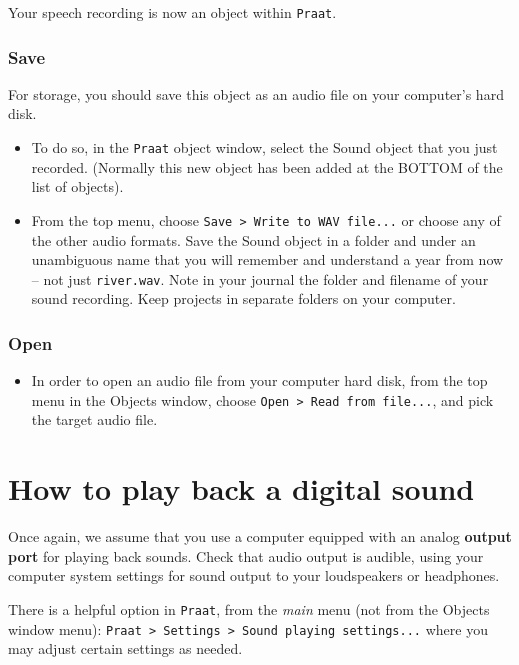 \documentclass[
]{book}
\providecommand{\tightlist}{%
  \setlength{\itemsep}{0pt}\setlength{\parskip}{0pt}}
\begin{document}
Your speech recording is now an object within \texttt{Praat}.

\subsubsection{Save}\label{sec:praatsave}

For storage, you should save this object as an audio file on your computer's hard disk.

\begin{itemize}
\item
  To do so, in the \texttt{Praat} object window, select the Sound object that you just recorded. (Normally this new object has been added at the BOTTOM of the list of objects).
\item
  From the top menu, choose \texttt{Save\ \textgreater{}\ Write\ to\ WAV\ file...} or choose any of the other audio formats. Save the Sound object in a folder and under an unambiguous name that you will remember and understand a year from now -- not just \texttt{river.wav}. Note in your journal the folder and filename of your sound recording. Keep projects in separate folders on your computer.
\end{itemize}

\subsubsection{Open}\label{sec:praatopen}

\begin{itemize}
\tightlist
\item
  In order to open an audio file from your computer hard disk, from the top menu in the Objects window, choose \texttt{Open\ \textgreater{}\ Read\ from\ file...}, and pick the target audio file.
\end{itemize}

\section{How to play back a digital sound}\label{how-to-play-back-a-digital-sound}

Once again, we assume that you use a computer equipped with an analog \textbf{output port} for playing back sounds. Check that audio output is audible, using your computer system settings for sound output to your loudspeakers or headphones.

There is a helpful option in \texttt{Praat}, from the \emph{main} menu (not from the Objects window menu): \texttt{Praat\ \textgreater{}\ Settings\ \textgreater{}\ Sound\ playing\ settings...} where you may adjust certain settings as needed.
\end{document}

